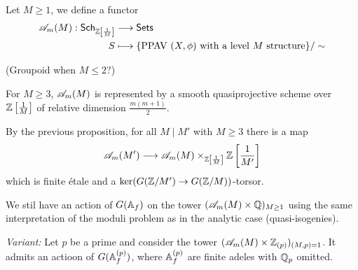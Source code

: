 \begin{definition}
	Let $M\ge 1$, we define a functor
	\begin{align*}
		\mathscr{A}_m(M): \mathsf{Sch}_{\mathbb Z\left[ \frac{1}{M} \right] } &\longrightarrow \mathsf{Sets} \\
		S &\longmapsto \{\text{PPAV }(X,\phi)\text{ with a level }M\text{ structure}\} /\sim
	\end{align*}
\end{definition}
(Groupoid when $M\le 2$?)
\begin{theorem}[Mumford]
	For $M\ge 3$, $\mathscr{A}_m(M)$ is represented by a smooth quasiprojective scheme over
	$\mathbb Z\left[ \frac{1}{M} \right] $ of relative dimension $\frac{m(m+1)}{2}$.
\end{theorem}
By the previous proposition, for all $M \mid M'$ with $M\ge 3$ there is a map
\[
	\CA_m(M') \to \CA_m(M) \times_{\Z\left[ \frac{1}{M} \right] }\Z\left[ \frac{1}{M'} \right]
\]
which is finite \'etale and a $\ker(G(\Z /M')\to G(\Z /M))$-torsor.

We stil have an action of $G(\mathbb{A}_f)$ on the tower $(\mathscr{A}_m(M)\times \mathbb Q)_{M\ge 1}$ using the
same interpretation of the moduli problem as in the analytic case (quasi-isogenies).

\emph{Variant:} Let $p$ be a prime and consider the tower $(\mathscr{A}_m(M)\times
\mathbb Z_{(p)})_{(M,p)=1}$. It admits an actioon of $G(\mathbb{A}_f^{(p)})$, where $\mathbb{A}_f^{(p)}$ are
finite adeles with $\mathbb Q_p$ omitted.

